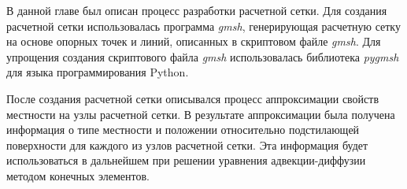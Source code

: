 В данной главе был описан процесс разработки расчетной сетки. Для создания расчетной сетки использовалась программа 
\textit{gmsh}, генерирующая расчетную сетку на основе опорных точек и линий, описанных в скриптовом файле \textit{gmsh}. 
Для упрощения создания скриптового файла \textit{gmsh} использовалась библиотека \textit{pygmsh} для языка 
программирования Python. 

После создания расчетной сетки описывался процесс аппроксимации свойств местности на узлы расчетной сетки. В результате 
аппроксимации была получена информация о типе местности и положении относительно подстилающей поверхности для каждого из 
узлов расчетной сетки. Эта информация будет использоваться в дальнейшем при решении уравнения адвекции-диффузии методом 
конечных элементов.   

